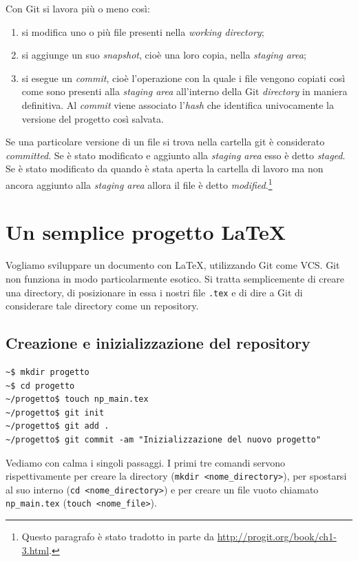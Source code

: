 \documentclass[a4paper,12pt,oneside]{article}
\begin{document}
Con Git si lavora più o meno così:
\label{list:lavoro-git}
\begin{enumerate}
\item si modifica uno o più file presenti nella \emph{working directory};
\item si aggiunge un suo \emph{snapshot}, cioè una loro copia, nella
  \emph{staging area};
\item si esegue un \emph{commit}, cioè l'operazione con la quale i file vengono
  copiati così come sono presenti alla \emph{staging area} all'interno della Git
  \emph{directory} in maniera definitiva. Al \emph{commit} viene associato
  l'\emph{hash} che identifica univocamente la versione del progetto così
  salvata.
\end{enumerate}
Se una particolare versione di un file si trova nella cartella git è considerato
\emph{committed}. Se è stato modificato e aggiunto alla \emph{staging area} esso
è detto \emph{staged}. Se è stato modificato da quando è stata aperta la cartella
di lavoro ma non ancora aggiunto alla \emph{staging area} allora il file è detto
\emph{modified}.\footnote{Questo paragrafo è stato tradotto in parte da
  \url{http://progit.org/book/ch1-3.html}.}

\section{Un semplice progetto \LaTeX}
Vogliamo sviluppare un documento con \LaTeX, utilizzando Git come VCS.
Git non funziona in modo particolarmente esotico. Si tratta semplicemente di
creare una directory, di posizionare in essa i nostri file \lstinline|.tex| e di
dire a Git di considerare tale directory come un repository.
\subsection{Creazione e inizializzazione del repository}
\begin{lstlisting}
~$ mkdir progetto
~$ cd progetto
~/progetto$ touch np_main.tex
~/progetto$ git init
~/progetto$ git add .
~/progetto$ git commit -am "Inizializzazione del nuovo progetto"
\end{lstlisting}
Vediamo con calma i singoli passaggi. I primi tre comandi servono
rispettivamente per creare la directory (\lstinline|mkdir <nome_directory>|),
per spostarsi al suo interno (\lstinline|cd <nome_directory>|) e per creare
un file vuoto chiamato \lstinline|np_main.tex| (\lstinline|touch <nome_file>|).
\end{document}
